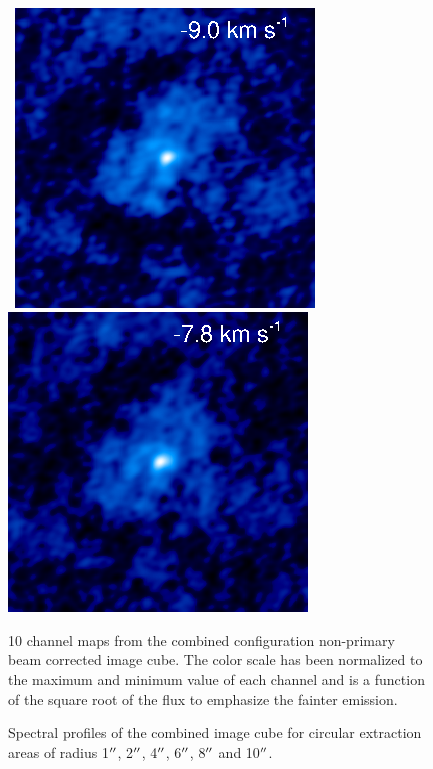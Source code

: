 \documentclass[manuscript]{aastex}
\begin{document}
\begin{figure}[hbt!]
{         }
\\
\mbox{
          \includegraphics[]{f10.eps}
          \includegraphics[]{f11.eps}
         }
\caption[]{10 channel maps from the combined configuration non-primary beam corrected image cube. The color scale has been normalized to the maximum and minimum value of each channel and is a function of the square root of the flux to emphasize the fainter emission.}
\label{fig:fig3}
\end{figure}


\clearpage

\begin{figure}
\caption{Spectral profiles of the combined image cube for circular extraction areas of radius 1$\mbox{$^{\prime\prime}$}$, 2$\mbox{$^{\prime\prime}$}$, 4$\mbox{$^{\prime\prime}$}$, 6$\mbox{$^{\prime\prime}$}$, 8$\mbox{$^{\prime\prime}$}$ and 10$\mbox{$^{\prime\prime}$}$.}
\label{fig:fig4}
\end{figure}

\clearpage
\end{document}
